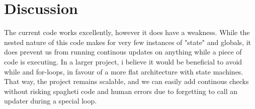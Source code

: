 \documentclass[journal]{IEEEtran}
\begin{document}


\vfill\null
\pagebreak










\section{Discussion}
The current code works excellently, however it does have a weakness.
While the nested nature of this code makes for very few instances of "state" and
globals, it does prevent us from running continous updates on anything while
a piece of code is executing. In a larger project, i believe it would be
beneficial to avoid while and for-loops, in favour of a more flat architecture with
state machines. That way, the project remains scalable, and we can easily add
continous checks without risking spagheti code and human errors due to forgetting
to call an updater during a special loop.
\end{document}
